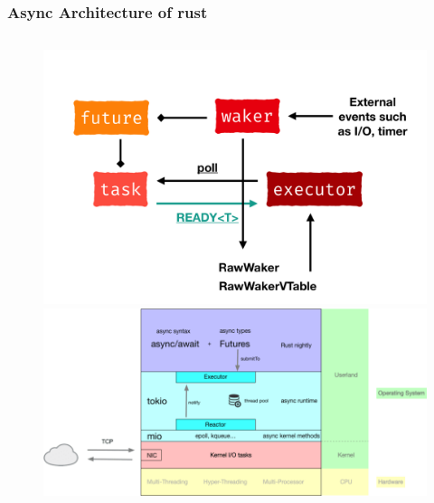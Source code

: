 \begin{frame}[fragile]
    \frametitle{Async Architecture of rust}
    \begin{columns}
        \begin{column}{.4\textwidth}
            \begin{figure}
                \includegraphics[width=1.\linewidth]{figs/rust-async-simple-arch.png}
                \includegraphics[width=.8\linewidth]{figs/rust-async-arch.png}
            \end{figure}
        \end{column}
        

\end{columns}
\end{frame}
